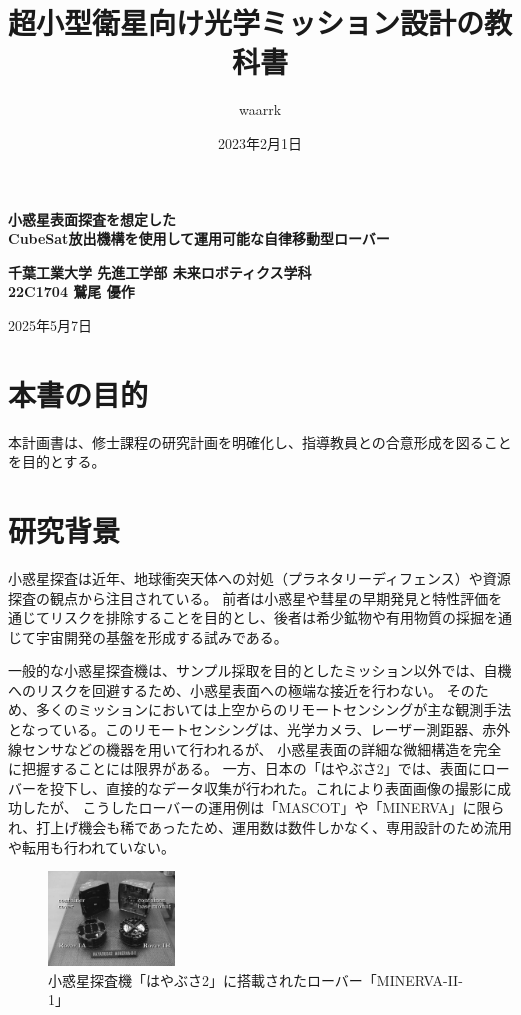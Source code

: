 \documentclass[dvipdfmx,titlepage,a4j]{jsarticle}
\title{超小型衛星向け光学ミッション設計の教科書}
\author{waarrk}
\date{2023年2月1日}
\begin{document}
\begin{titlepage}
    \centering
    \vspace*{2cm}

    \vspace{5cm}

    {\LARGE \textbf{小惑星表面探査を想定した\\CubeSat放出機構を使用して運用可能な自律移動型ローバー}}

    \vspace{0.5cm}

    {\textbf{千葉工業大学 先進工学部 未来ロボティクス学科}\\}
    {\textbf{22C1704 鷲尾 優作}}

    \vfill

    {\large 2025年5月7日}

    \vspace{1cm}
\end{titlepage}

\newpage

\section{本書の目的}
本計画書は、修士課程の研究計画を明確化し、指導教員との合意形成を図ることを目的とする。

\section{研究背景}
小惑星探査は近年、地球衝突天体への対処（プラネタリーディフェンス）や資源探査の観点から注目されている。
前者は小惑星や彗星の早期発見と特性評価を通じてリスクを排除することを目的とし、後者は希少鉱物や有用物質の採掘を通じて宇宙開発の基盤を形成する試みである。

一般的な小惑星探査機は、サンプル採取を目的としたミッション以外では、自機へのリスクを回避するため、小惑星表面への極端な接近を行わない。
そのため、多くのミッションにおいては上空からのリモートセンシングが主な観測手法となっている。このリモートセンシングは、光学カメラ、レーザー測距器、赤外線センサなどの機器を用いて行われるが、
小惑星表面の詳細な微細構造を完全に把握することには限界がある。
一方、日本の「はやぶさ2」では、表面にローバーを投下し、直接的なデータ収集が行われた。これにより表面画像の撮影に成功したが、
こうしたローバーの運用例は「MASCOT」や「MINERVA」に限られ、打上げ機会も稀であったため、運用数は数件しかなく、専用設計のため流用や転用も行われていない。

\begin{figure}[H]
    \centering
    \includegraphics[width=0.3\textwidth]{picture/mine.png}
    \caption{小惑星探査機「はやぶさ2」に搭載されたローバー「MINERVA-II-1」}
    \label{fig:hayabusa2}
\end{figure}
\end{document}
